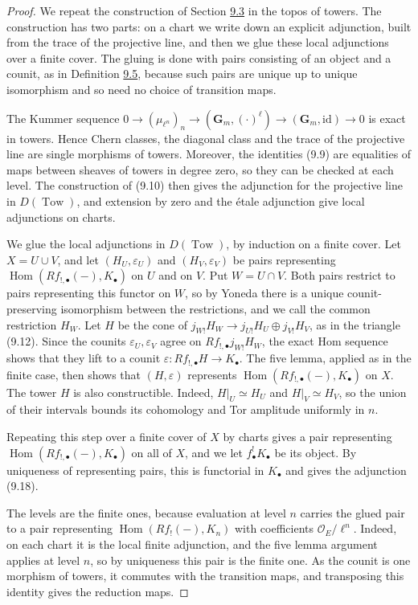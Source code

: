 \documentclass[11pt]{article}
\begin{document}
\begin{proof}[{Proof}]\label{bp61}%
We repeat the construction of Section \hyperref[bp17]{9.3} in the topos of towers. The construction has two parts: on a chart we write down an explicit adjunction, built from the trace of the projective line, and then we glue these local adjunctions over a finite cover. The gluing is done with pairs consisting of an object and a counit, as in Definition \hyperref[bp19]{9.5}, because such pairs are unique up to unique isomorphism and so need no choice of transition maps.

The Kummer sequence \(0\to(\mu_{\ell^n})_n\to(\mathbf G_m,(\cdot)^\ell)\to(\mathbf G_m,\mathrm{id})\to0\) is exact in towers. Hence Chern classes, the diagonal class and the trace of the projective line are single morphisms of towers. Moreover, the identities (9.9) are equalities of maps between sheaves of towers in degree zero, so they can be checked at each level. The construction of (9.10) then gives the adjunction for the projective line in \(D(\operatorname{Tow})\), and extension by zero and the étale adjunction give local adjunctions on charts.

We glue the local adjunctions in \(D(\operatorname{Tow})\), by induction on a finite cover. Let \(X=U\cup V\), and let \((H_U,\varepsilon_U)\) and \((H_V,\varepsilon_V)\) be pairs representing \(\operatorname{Hom}(Rf_{!,\bullet}(-),K_\bullet)\) on \(U\) and on \(V\). Put \(W=U\cap V\). Both pairs restrict to pairs representing this functor on \(W\), so by Yoneda there is a unique counit-preserving isomorphism between the restrictions, and we call the common restriction \(H_W\). Let \(H\) be the cone of \(j_{W!}H_W\to j_{U!}H_U\oplus j_{V!}H_V\), as in the triangle (9.12). Since the counits \(\varepsilon_U,\varepsilon_V\) agree on \(Rf_{!,\bullet}j_{W!}H_W\), the exact Hom sequence shows that they lift to a counit \(\varepsilon:Rf_{!,\bullet}H\to K_\bullet\). The five lemma, applied as in the finite case, then shows that \((H,\varepsilon)\) represents \(\operatorname{Hom}(Rf_{!,\bullet}(-),K_\bullet)\) on \(X\). The tower \(H\) is also constructible. Indeed, \(H|_U\simeq H_U\) and \(H|_V\simeq H_V\), so the union of their intervals bounds its cohomology and Tor amplitude uniformly in \(n\).

Repeating this step over a finite cover of \(X\) by charts gives a pair representing \(\operatorname{Hom}(Rf_{!,\bullet}(-),K_\bullet)\) on all of \(X\), and we let \(f^!_\bullet K_\bullet\) be its object. By uniqueness of representing pairs, this is functorial in \(K_\bullet\) and gives the adjunction (9.18).

The levels are the finite ones, because evaluation at level \(n\) carries the glued pair to a pair representing \(\operatorname{Hom}(Rf_!(-),K_n)\) with coefficients \(\mathcal O_E/\ell^n\). Indeed, on each chart it is the local finite adjunction, and the five lemma argument applies at level \(n\), so by uniqueness this pair is the finite one. As the counit is one morphism of towers, it commutes with the transition maps, and transposing this identity gives the reduction maps.
\end{proof}
\end{document}
